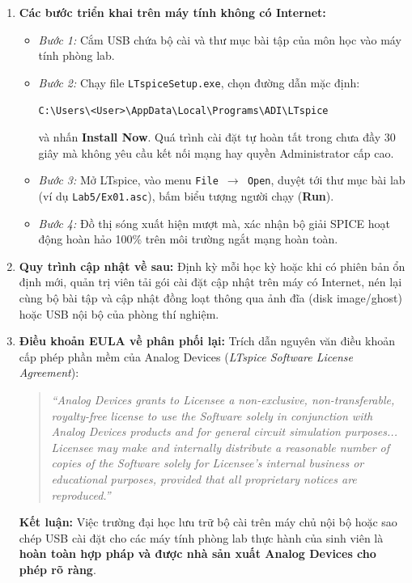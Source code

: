 \documentclass[12pt,a4paper]{article}
\begin{document}
\begin{enumerate}
  \item \textbf{Các bước triển khai trên máy tính không có Internet:}
  \begin{itemize}
    \item \textit{Bước 1:} Cắm USB chứa bộ cài và thư mục bài tập của môn học vào máy tính phòng lab.
    \item \textit{Bước 2:} Chạy file \texttt{LTspiceSetup.exe}, chọn đường dẫn mặc định:
    \begin{center}\small
    \texttt{C:\textbackslash Users\textbackslash <User>\textbackslash AppData\textbackslash Local\textbackslash Programs\textbackslash ADI\textbackslash LTspice}
    \end{center}
    và nhấn \textbf{Install Now}. Quá trình cài đặt tự hoàn tất trong chưa đầy 30 giây mà không yêu cầu kết nối mạng hay quyền Administrator cấp cao.
    \item \textit{Bước 3:} Mở LTspice, vào menu \texttt{File $\rightarrow$ Open}, duyệt tới thư mục bài lab (ví dụ \texttt{Lab5/Ex01.asc}), bấm biểu tượng người chạy (\textbf{Run}).
    \item \textit{Bước 4:} Đồ thị sóng xuất hiện mượt mà, xác nhận bộ giải SPICE hoạt động hoàn hảo 100\% trên môi trường ngắt mạng hoàn toàn.
  \end{itemize}

  \item \textbf{Quy trình cập nhật về sau:}
  Định kỳ mỗi học kỳ hoặc khi có phiên bản ổn định mới, quản trị viên tải gói cài đặt cập nhật trên máy có Internet, nén lại cùng bộ bài tập và cập nhật đồng loạt thông qua ảnh đĩa (disk image/ghost) hoặc USB nội bộ của phòng thí nghiệm.

  \item \textbf{Điều khoản EULA về phân phối lại:}
  Trích dẫn nguyên văn điều khoản cấp phép phần mềm của Analog Devices (\textit{LTspice Software License Agreement}):
  \begin{quote}
  \itshape
  ``Analog Devices grants to Licensee a non-exclusive, non-transferable, royalty-free license to use the Software solely in conjunction with Analog Devices products and for general circuit simulation purposes... Licensee may make and internally distribute a reasonable number of copies of the Software solely for Licensee's internal business or educational purposes, provided that all proprietary notices are reproduced.''
  \end{quote}
  \textbf{Kết luận:} Việc trường đại học lưu trữ bộ cài trên máy chủ nội bộ hoặc sao chép USB cài đặt cho các máy tính phòng lab thực hành của sinh viên là \textbf{hoàn toàn hợp pháp và được nhà sản xuất Analog Devices cho phép rõ ràng}.
\end{enumerate}
\end{document}
